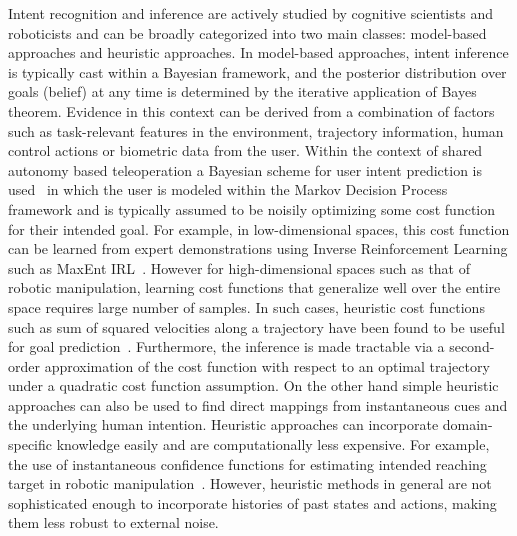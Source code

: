 \documentclass[natbib, twocolumn]{svjour3}          %
\begin{document}
Intent recognition and inference are actively studied by cognitive scientists and roboticists and can be broadly categorized into two main classes: model-based approaches and heuristic approaches. In model-based approaches, intent inference is typically cast within a Bayesian framework, and the posterior distribution over goals (belief) at any time is determined by the iterative application of Bayes theorem. Evidence in this context can be derived from a combination of factors such as task-relevant features in the environment, trajectory information, human control actions or biometric data from the user. Within the context of shared autonomy based teleoperation a Bayesian scheme for user intent prediction is used~\citep{dragan2012formalizing, javdani2017shared, admoni2016predicting} in which the user is modeled within the Markov Decision Process framework and is typically assumed to be noisily optimizing some cost function for their intended goal. For example, in low-dimensional spaces, this cost function can be learned from expert demonstrations using Inverse Reinforcement Learning such as MaxEnt IRL~\citep{ziebart2008maximum}. However for high-dimensional spaces such as that of robotic manipulation, learning cost functions that generalize well over the entire space requires large number of samples. In such cases, heuristic cost functions such as sum of squared velocities along a trajectory have been found to be useful for goal prediction~\citep{dragan2013policy}. Furthermore, the inference is made tractable via a second-order approximation of the cost function with respect to an optimal trajectory under a quadratic cost function assumption.  On the other hand simple heuristic approaches can also be used to find direct mappings from instantaneous cues and the underlying human intention. Heuristic approaches can incorporate domain-specific knowledge easily and are computationally less expensive. For example, the use of instantaneous confidence functions for estimating intended reaching target in robotic manipulation~\citep{dragan2012assistive, gopinath2017human}.  However, heuristic methods in general are not sophisticated enough to incorporate histories of past states and actions, making them less robust to external noise. 
\end{document}
